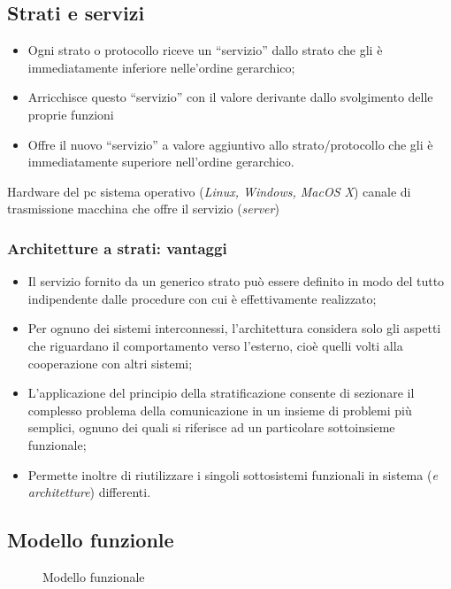 \subsection{Strati e servizi}
\label{sec:strateserv}

\begin{itemize}
\item Ogni strato o protocollo riceve un ``servizio'' dallo strato che gli è immediatamente inferiore nelle'ordine
  gerarchico;
\item Arricchisce questo ``servizio'' con il valore derivante dallo svolgimento delle proprie funzioni
\item Offre il nuovo ``servizio'' a valore aggiuntivo allo strato/protocollo che gli è immediatamente
  superiore nell'ordine gerarchico.
\end{itemize}
\begin{center}
  Hardware del pc \textrightarrow{} sistema operativo ({\it Linux, Windows, MacOS X}) \textrightarrow{} canale
  di trasmissione \textrightarrow{} macchina che offre il servizio ({\it server})
\end{center}

\subsubsection{Architetture a strati: vantaggi}
\label{sec:archastrativan}

\begin{itemize}
\item Il servizio fornito da un generico strato può essere definito in modo del tutto indipendente dalle
  procedure con cui è effettivamente realizzato;
\item Per ognuno dei sistemi interconnessi, l'architettura considera solo gli aspetti che riguardano il
  comportamento verso l'esterno, cioè quelli volti alla cooperazione con altri sistemi;
\item L'applicazione del principio della stratificazione consente di sezionare il complesso problema della
  comunicazione in un insieme di problemi più semplici, ognuno dei quali si riferisce ad un particolare
  sottoinsieme funzionale;
\item Permette inoltre di riutilizzare i singoli sottosistemi funzionali in sistema ({\it e architetture})
  differenti.
\end{itemize}
\clearpage
\subsection{Modello funzionle}
\label{sec:modfun}
\begin{figure}[ht!]
  \centering
  \resizebox{14cm}{!} {}
  \caption{Modello funzionale}
  \label{fig:modfun}
\end{figure}

